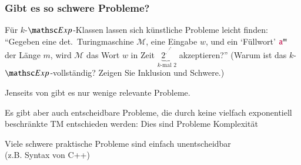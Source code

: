 \documentclass[aspectratio=1610,onlymath]{beamer}
\begin{document}
\begin{frame}\frametitle{Gibt es so schwere Probleme?}\pause

Für $k$-$\complclass{Exp}$-Klassen lassen sich künstliche Probleme leicht finden: %
"`Gegeben eine det.\ Turingmaschine $\mathcal{M}$, eine Eingabe $w$, und ein `Füllwort' $\mathtt{\textcolor{purple}{a}}^m$ der Länge $m$, wird $\mathcal{M}$ das Wort $w$ in Zeit $\underbrace{2^{.^{.^{.^{2^{m}}}}}}_{k\text{-mal 2}}$ akzeptieren?"'
{\tiny (Warum ist das $k$-$\complclass{Exp}$-vollständig? Zeigen Sie Inklusion und Schwere.)}
\bigskip\pause

Jenseits von \ExpSpace gibt es nur wenige relevante Probleme.\medskip

\pause

Es gibt aber auch entscheidbare Probleme, die durch keine vielfach exponentiell 
beschränkte TM entschieden werden: Dies sind Probleme 
Komplexität\medskip

\pause

Viele schwere praktische Probleme sind einfach unentscheidbar\\[-1ex]
{\tiny (z.B. Syntax von C++)}

\end{frame}
\end{document}
